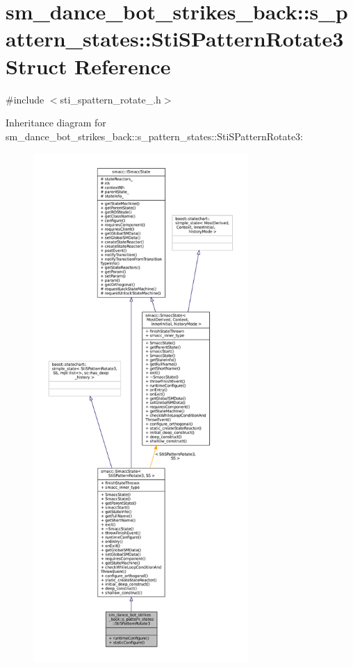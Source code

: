 \hypertarget{structsm__dance__bot__strikes__back_1_1s__pattern__states_1_1StiSPatternRotate3}{}\section{sm\+\_\+dance\+\_\+bot\+\_\+strikes\+\_\+back\+:\+:s\+\_\+pattern\+\_\+states\+:\+:Sti\+S\+Pattern\+Rotate3 Struct Reference}
\label{structsm__dance__bot__strikes__back_1_1s__pattern__states_1_1StiSPatternRotate3}


{\ttfamily \#include $<$sti\+\_\+spattern\+\_\+rotate\+\_.\+h$>$}



Inheritance diagram for sm\+\_\+dance\+\_\+bot\+\_\+strikes\+\_\+back\+:\+:s\+\_\+pattern\+\_\+states\+:\+:Sti\+S\+Pattern\+Rotate3\+:
\nopagebreak
\begin{figure}[H]
\begin{center}
\leavevmode
\includegraphics[height=550pt]{structsm__dance__bot__strikes__back_1_1s__pattern__states_1_1StiSPatternRotate3__inherit__graph}
\end{center}
\end{figure}


